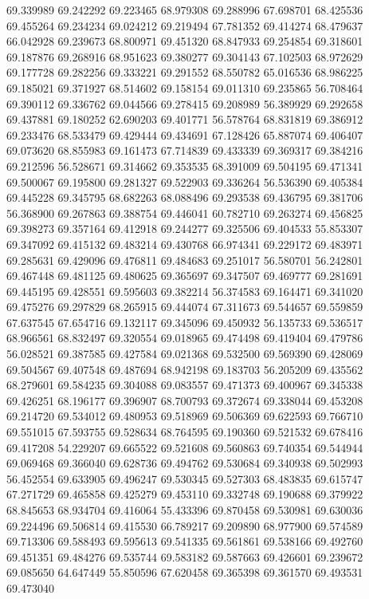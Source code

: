 69.339989
69.242292
69.223465
68.979308
69.288996
67.698701
68.425536
69.455264
69.234234
69.024212
69.219494
67.781352
69.414274
68.479637
66.042928
69.239673
68.800971
69.451320
68.847933
69.254854
69.318601
69.187876
69.268916
68.951623
69.380277
69.304143
67.102503
68.972629
69.177728
69.282256
69.333221
69.291552
68.550782
65.016536
68.986225
69.185021
69.371927
68.514602
69.158154
69.011310
69.235865
56.708464
69.390112
69.336762
69.044566
69.278415
69.208989
56.389929
69.292658
69.437881
69.180252
62.690203
69.401771
56.578764
68.831819
69.386912
69.233476
68.533479
69.429444
69.434691
67.128426
65.887074
69.406407
69.073620
68.855983
69.161473
67.714839
69.433339
69.369317
69.384216
69.212596
56.528671
69.314662
69.353535
68.391009
69.504195
69.471341
69.500067
69.195800
69.281327
69.522903
69.336264
56.536390
69.405384
69.445228
69.345795
68.682263
68.088496
69.293538
69.436795
69.381706
56.368900
69.267863
69.388754
69.446041
60.782710
69.263274
69.456825
69.398273
69.357164
69.412918
69.244277
69.325506
69.404533
55.853307
69.347092
69.415132
69.483214
69.430768
66.974341
69.229172
69.483971
69.285631
69.429096
69.476811
69.484683
69.251017
56.580701
56.242801
69.467448
69.481125
69.480625
69.365697
69.347507
69.469777
69.281691
69.445195
69.428551
69.595603
69.382214
56.374583
69.164471
69.341020
69.475276
69.297829
68.265915
69.444074
67.311673
69.544657
69.559859
67.637545
67.654716
69.132117
69.345096
69.450932
56.135733
69.536517
68.966561
68.832497
69.320554
69.018965
69.474498
69.419404
69.479786
56.028521
69.387585
69.427584
69.021368
69.532500
69.569390
69.428069
69.504567
69.407548
69.487694
68.942198
69.183703
56.205209
69.435562
68.279601
69.584235
69.304088
69.083557
69.471373
69.400967
69.345338
69.426251
68.196177
69.396907
68.700793
69.372674
69.338044
69.453208
69.214720
69.534012
69.480953
69.518969
69.506369
69.622593
69.766710
69.551015
67.593755
69.528634
68.764595
69.190360
69.521532
69.678416
69.417208
54.229207
69.665522
69.521608
69.560863
69.740354
69.544944
69.069468
69.366040
69.628736
69.494762
69.530684
69.340938
69.502993
56.452554
69.633905
69.496247
69.530345
69.527303
68.483835
69.615747
67.271729
69.465858
69.425279
69.453110
69.332748
69.190688
69.379922
68.845653
68.934704
69.416064
55.433396
69.870458
69.530981
69.630036
69.224496
69.506814
69.415530
66.789217
69.209890
68.977900
69.574589
69.713306
69.588493
69.595613
69.541335
69.561861
69.538166
69.492760
69.451351
69.484276
69.535744
69.583182
69.587663
69.426601
69.239672
69.085650
64.647449
55.850596
67.620458
69.365398
69.361570
69.493531
69.473040
